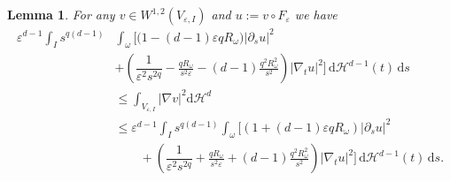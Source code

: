 \documentclass[11pt,oneside,reqno,a4paper]{amsart}
\newcommand{\dd}{\mathrm{d}}
\renewcommand{\H}{\mathcal{H}}
\newcommand{\eps}{\varepsilon}
\newtheorem{lemma}[theorem]{Lemma}
\theoremstyle{definition}
\begin{document}
\begin{lemma}\label{two side est of gradient}
	For any $v\in W^{1,2}(V_{\eps,I})$ and $u:=v\circ F_\eps$ we have
\begin{align*}
			\eps^{d-1}\int_Is^{q(d-1)}&\int_{\omega}\Bigg[\big(1-(d-1)\eps qR_\omega\big)|\partial_su|^2\\
			&+\left(\dfrac{1}{\eps^2s^{2q}}-\frac{qR_\omega}{s^2\eps}-(d-1)\frac{q^2R^2_\omega}{s^2}\right)|\nabla_tu|^2\Bigg]\,\dd\H^{d-1}(t)\,\dd s\\
			&\leq\int_{V_{\eps,I}}|\nabla v|^2\dd\H^d\\
			&\leq\eps^{d-1}\int_I s^{q(d-1)}\int_{\omega}\Bigg[\left(1+(d-1)\eps qR_\omega\right)|\partial_su|^2\\
			&\qquad+\left(\dfrac{1}{\eps^2s^{2q}}+\frac{qR_\omega}{s^2\eps}+(d-1)\frac{q^2R^2_\omega}{s^2}\right)|\nabla_tu|^2\Bigg]\,\dd\H^{d-1}(t)\,\dd s.
\end{align*}
\end{lemma}
\end{document}
